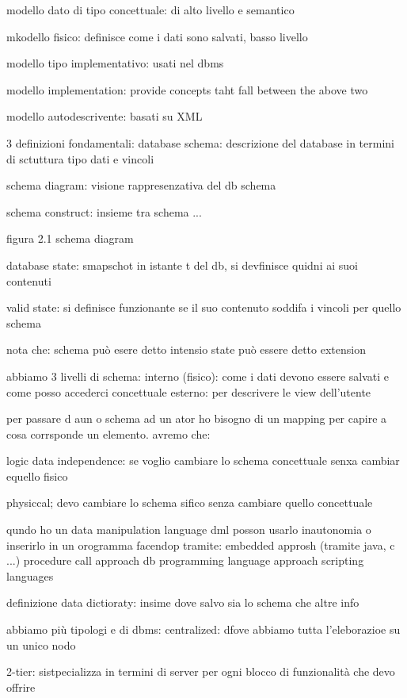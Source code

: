 modello dato di tipo concettuale: di alto livello e semantico

mkodello fisico: definisce come i dati sono salvati, basso livello

modello tipo implementativo: usati nel dbms 

modello implementation: provide concepts taht fall between the above two

modello autodescrivente: basati su XML 



3 definizioni fondamentali:
database schema: descrizione del database in termini di sctuttura tipo dati e vincoli

schema diagram: visione rappresenzativa del db schema

schema construct: insieme tra schema ...


figura 2.1 schema diagram

database state: smapschot in istante t del db, si devfinisce quidni ai suoi contenuti

valid state: si definisce funzionante se il suo contenuto soddifa i vincoli per quello schema

nota che:
schema può esere detto intensio
state può essere detto extension


abbiamo 3 livelli di schema:
interno (fisico): come i dati devono essere salvati e come posso accederci
concettuale
esterno: per descrivere le view dell'utente


per passare d aun o schema ad un ator ho bisogno di un mapping per capire a cosa corrsponde un elemento. avremo che:

logic data independence: se voglio cambiare lo schema concettuale senxa cambiar equello fisico

physiccal; devo cambiare lo schema sifico senza cambiare quello concettuale



qundo ho un data manipulation language dml posson usarlo inautonomia o inserirlo in un orogramma facendop tramite:
embedded approsh (tramite java, c ...)
procedure call approach
db programming language approach
scripting languages


definizione
data dictioraty: insime dove salvo sia lo schema che altre info 



abbiamo più tipologi e di dbms:
centralized: dfove abbiamo tutta l'eleborazioe su un unico nodo

2-tier: sistpecializza in termini di server per ogni blocco di funzionalità che devo offrire

